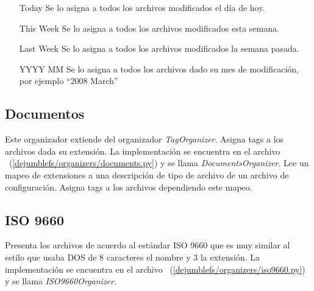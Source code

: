 \begin{itemize}
\item[Today] Se lo asigna a todos los archivos modificados el día de hoy.
\item[This Week] Se lo asigna a todos los archivos modificados esta semana.
\item[Last Week] Se lo asigna a todos los archivos modificados la semana pasada.
\item[YYYY MM] Se lo asigna a todos los archivos dado su mes de modificación, por ejemplo ``2008 March''
\end{itemize}

\subsection{Documentos}

Este organizador extiende del organizador \textit{TagOrganizer}. Asigna tags a los archivos dada su extensión. La implementación se encuentra en el archivo ~(\ref{dejumblefs/organizers/documents.py}) y se llama \textit{DocumentsOrganizer}. Lee un mapeo de extensiones a una descripción de tipo de archivo de un archivo de configuración. Asigna tags a los archivos dependiendo este mapeo.

\subsection{ISO 9660}

Presenta los archivos de acuerdo al estándar ISO 9660 que es muy similar al estilo que usaba DOS de 8 caracteres el nombre y 3 la extensión. La implementación se encuentra en el archivo ~(\ref{dejumblefs/organizers/iso9660.py}) y se llama \textit{ISO9660Organizer}.


